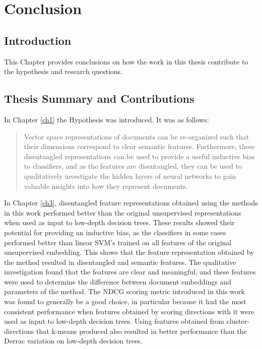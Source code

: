 \chapter{Conclusion}\label{ch6}





\section{Introduction}


This Chapter provides conclusions on how the work in this thesis contribute to the hypothesis and research questions. 

\section{Thesis Summary and Contributions}

In Chapter \ref{ch1} the Hypothesis was introduced. It was as follows:  

\begin{quote}
Vector space representations of documents can be re-organized  such that their dimensions correspond to clear semantic features. Furthermore, these disentangled representations can be used to provide a useful inductive bias to classifiers, and as the features are disentangled, they can be used to qualitatively investigate the hidden layers of neural networks to gain valuable insights into how they represent documents.
\end{quote}

In Chapter \ref{ch3}, disentangled feature representations obtained using the methods in this work performed better than the original unsupervised representations when used as input to low-depth decision trees. These results showed their potential for providing an inductive bias, as the classifiers in some cases performed better than linear SVM's trained on all features of the original unsupervised embedding. This shows that the feature representation obtained by the method resulted in disentangled and semantic features. The qualitative investigation found that the features are clear and meaningful, and these features were used to determine the difference between document embeddings and parameters of the method. The NDCG scoring metric introduced in this work was found to generally be a good choice, in particular because it had the most consistent performance when features obtained by scoring directions with it were used as input to low-depth decision trees. Using features obtained from cluster-directions that k-means produced also resulted in better performance than the Derrac variation on low-depth decision trees.

